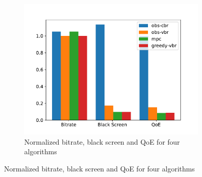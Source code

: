 \begin{figure}[htb]
\centering
\begin{subfigure}[b]{.8\columnwidth}
\centering
\includegraphics[width=\textwidth]{fig/massive_qoe.pdf}
\caption{Normalized bitrate, black screen and QoE for four algorithms}
\label{fig:vbr-qoe}
\end{subfigure}
\end{figure}

